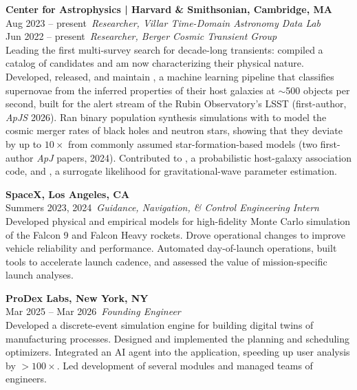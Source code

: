 \documentclass[11pt,letterpaper]{article}
\begin{document}
\begin{list}{}{\cvlist}
    \item
        \textbf{Center for Astrophysics | Harvard \& Smithsonian, Cambridge, MA} \\
        {\color{numcolor} Aug 2023 -- present}\,
        \emph{Researcher, Villar Time-Domain Astronomy Data Lab} \\
        {\color{numcolor} Jun 2022 -- present}\,
        \emph{Researcher, Berger Cosmic Transient Group} \\
        Leading the first multi-survey search for decade-long transients: compiled a catalog of candidates and am now characterizing their physical nature.
        Developed, released, and maintain \href{https://github.com/Adam-Boesky/astro_SPLASH}{}, a machine learning pipeline that classifies supernovae from the inferred properties of their host galaxies at $\sim$500 objects per second, built for the alert stream of the Rubin Observatory's LSST (first-author, \emph{ApJS} 2026).
        Ran binary population synthesis simulations with  to model the cosmic merger rates of black holes and neutron stars, showing that they deviate by up to $10\times$ from commonly assumed star-formation-based models (two first-author \emph{ApJ} papers, 2024).
        Contributed to , a probabilistic host-galaxy association code, and , a surrogate likelihood for gravitational-wave parameter estimation.
        \\[1.5ex]

    \item
        \textbf{SpaceX, Los Angeles, CA} \\
        {\color{numcolor} Summers 2023, 2024}\,
        \emph{Guidance, Navigation, \& Control Engineering Intern} \\
        Developed physical and empirical models for high-fidelity Monte Carlo simulation of the Falcon 9 and Falcon Heavy rockets.
        Drove operational changes to improve vehicle reliability and performance. Automated day-of-launch operations, built tools to accelerate launch cadence, and assessed the value of mission-specific launch analyses.
        \\[1.5ex]

    \item
        \textbf{ProDex Labs, New York, NY} \\
        {\color{numcolor} Mar 2025 -- Mar 2026}\,
        \emph{Founding Engineer} \\
        Developed a discrete-event simulation engine for building digital twins of manufacturing processes.
        Designed and implemented the planning and scheduling optimizers.
        Integrated an AI agent into the application, speeding up user analysis by $>100\times$. Led development of several modules and managed teams of engineers.
        \\[1.5ex]


\end{list}
\end{document}
